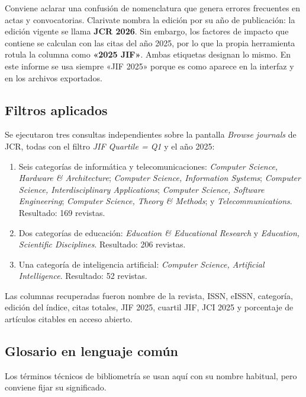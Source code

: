 \documentclass[11pt,a4paper]{article}
\begin{document}
Conviene aclarar una confusión de nomenclatura que genera errores frecuentes en actas y convocatorias. Clarivate nombra la edición por su año de publicación: la edición vigente se llama \textbf{JCR 2026}. Sin embargo, los factores de impacto que contiene se calculan con las citas del año 2025, por lo que la propia herramienta rotula la columna como \textbf{«2025 JIF»}. Ambas etiquetas designan lo mismo. En este informe se usa siempre «JIF 2025» porque es como aparece en la interfaz y en los archivos exportados.

\subsection{Filtros aplicados}

Se ejecutaron tres consultas independientes sobre la pantalla \emph{Browse journals} de JCR, todas con el filtro \emph{JIF Quartile = Q1} y el año 2025:

\begin{enumerate}[leftmargin=*,itemsep=3pt]
	\item Seis categorías de informática y telecomunicaciones: \emph{Computer Science, Hardware \& Architecture}; \emph{Computer Science, Information Systems}; \emph{Computer Science, Interdisciplinary Applications}; \emph{Computer Science, Software Engineering}; \emph{Computer Science, Theory \& Methods}; y \emph{Telecommunications}. Resultado: 169 revistas.
	\item Dos categorías de educación: \emph{Education \& Educational Research} y \emph{Education, Scientific Disciplines}. Resultado: 206 revistas.
	\item Una categoría de inteligencia artificial: \emph{Computer Science, Artificial Intelligence}. Resultado: 52 revistas.
\end{enumerate}

Las columnas recuperadas fueron nombre de la revista, ISSN, eISSN, categoría, edición del índice, citas totales, JIF 2025, cuartil JIF, JCI 2025 y porcentaje de artículos citables en acceso abierto.

\subsection{Glosario en lenguaje común}

Los términos técnicos de bibliometría se usan aquí con su nombre habitual, pero conviene fijar su significado.
\end{document}
